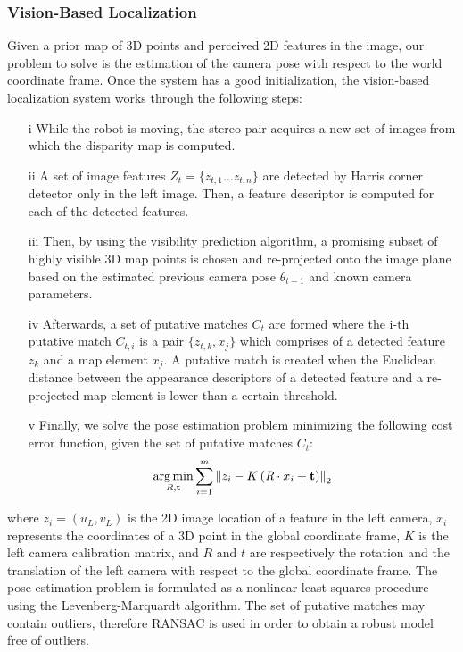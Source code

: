\subsubsection{Vision-Based Localization}
Given a prior map of 3D points and perceived 2D features in the image,
our problem to solve is the estimation of the camera pose with respect
to the world coordinate frame. Once the system has a good
initialization, the vision-based localization system works through the
following steps:
%
\begin{enumerate}
\item[i] While the robot is moving, the stereo pair acquires a new set of images from which the disparity map is computed.
\item[ii] A set of image features $Z_{t}=\{z_{t,1} \ldots z_{t,n}\}$ are detected by Harris corner detector only in the left image. Then, a feature descriptor is computed for each of the detected features.
\item[iii] Then, by using the visibility prediction algorithm, a promising subset of highly visible 3D map points is chosen and re-projected onto the image plane based on the estimated previous camera pose $\theta_{t-1}$ and known camera parameters.
\item[iv] Afterwards, a set of putative matches $C_{t}$ are formed where the i-th putative match $C_{t,i}$ is a pair $\{z_{t,k},x_{j}\}$ which comprises of a detected feature $z_{k}$ and a map element $x_{j}$. A putative match is created when the Euclidean distance between the appearance descriptors of a detected feature and a re-projected map element is lower than a certain threshold.
\item[v] Finally, we solve the pose estimation problem minimizing the following cost error function, given the set of putative matches $C_{t}$:
%
\begin{equation} \label{eq:pose_estimation}
\argmin \limits_{\emph{R},\mathbf{t}} \sum \limits_{i=1}^{m} \left\|z_{i} - K \left(\emph{R}\cdot x_{i} + \mathbf{t} \right)\right\|_{2}
\end{equation}
%
\end{enumerate}

where $z_{i}=\left(u_{L},v_{L}\right)$ is the 2D image location of a
feature in the left camera, $x_{i}$ represents the coordinates of a 3D
point in the global coordinate frame, $K$ is the left camera
calibration matrix, and $R$ and $t$ are respectively the rotation and
the translation of the left camera with respect to the global
coordinate frame. The pose estimation problem is formulated as a
nonlinear least squares procedure using the Levenberg-Marquardt
algorithm. The set of putative matches may contain outliers, therefore
RANSAC is used in order to obtain a robust model free of outliers.

